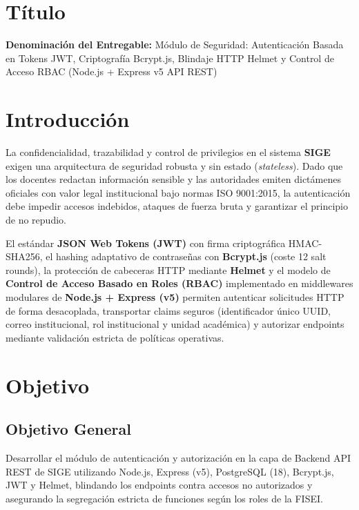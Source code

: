 \documentclass[12pt,a4paper]{article}
\begin{document}
\section{Título}
\textbf{Denominación del Entregable:} Módulo de Seguridad: Autenticación Basada en Tokens JWT, Criptografía Bcrypt.js, Blindaje HTTP Helmet y Control de Acceso RBAC (Node.js + Express v5 API REST)



\section{Introducción}
La confidencialidad, trazabilidad y control de privilegios en el sistema \textbf{SIGE} exigen una arquitectura de seguridad robusta y sin estado (\textit{stateless}). Dado que los docentes redactan información sensible y las autoridades emiten dictámenes oficiales con valor legal institucional bajo normas ISO 9001:2015, la autenticación debe impedir accesos indebidos, ataques de fuerza bruta y garantizar el principio de no repudio.

El estándar \textbf{JSON Web Tokens (JWT)} con firma criptográfica HMAC-SHA256, el hashing adaptativo de contraseñas con \textbf{Bcrypt.js} (coste 12 salt rounds), la protección de cabeceras HTTP mediante \textbf{Helmet} y el modelo de \textbf{Control de Acceso Basado en Roles (RBAC)} implementado en middlewares modulares de \textbf{Node.js + Express (v5)} permiten autenticar solicitudes HTTP de forma desacoplada, transportar claims seguros (identificador único UUID, correo institucional, rol institucional y unidad académica) y autorizar endpoints mediante validación estricta de políticas operativas.

\section{Objetivo}

\subsection{Objetivo General}
Desarrollar el módulo de autenticación y autorización en la capa de Backend API REST de SIGE utilizando Node.js, Express (v5), PostgreSQL (18), Bcrypt.js, JWT y Helmet, blindando los endpoints contra accesos no autorizados y asegurando la segregación estricta de funciones según los roles de la FISEI.
\end{document}
